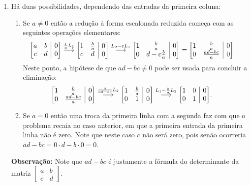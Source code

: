\documentclass[12pt,a4paper]{article}
\makeatletter
\newenvironment{amatrix}[1]{%
  \left[\begin{array}{@{}*{#1}{c}|c@{}}
}{%
  \end{array}\right]
}
\newcommand{\grstep}[2][\relax]{%
   \ensuremath{\mathrel{
       {\mathop{\longrightarrow}\limits^{#2\mathstrut}_{
                                     \begin{subarray}{l} #1 \end{subarray}}}}}}
\makeatother
\begin{document}
\begin{enumerate}
\item Há duas possibilidades, dependendo das entradas da primeira coluna:
\begin{enumerate}
\item Se $a \neq 0$ então a redução à forma escalonada reduzida começa com as seguintes operações elementares:
\begin{align*}
\begin{amatrix}{2}
a & b & 0 \\
c & d & 0
\end{amatrix}
&
\grstep{ \frac{1}{a} L_1 }
\begin{amatrix}{2}
1 & \frac{b}{a} & 0 \\
c & d & 0
\end{amatrix}
\grstep{ L_2 - c L_1 }
\begin{amatrix}{2}
1 & \frac{b}{a} & 0 \\
0 & d-c\frac{b}{a} & 0
\end{amatrix}
=
\begin{amatrix}{2}
1 & \frac{b}{a} & 0 \\
0 & \frac{ad-bc}{a} & 0
\end{amatrix}
\end{align*}
Neste ponto, a hipótese de que $ad-bc \neq 0$ pode ser usada para concluir a eliminação:
\begin{align*}
\begin{amatrix}{2}
1 & \frac{b}{a} & 0 \\
0 & \frac{ad-bc}{a} & 0
\end{amatrix}
&
\grstep{ \frac{a}{ad-bc} L_2 }
\begin{amatrix}{2}
1 & \frac{b}{a} & 0 \\
0 & 1 & 0
\end{amatrix}
\grstep{ L_1 - \frac{b}{a} L_2 }
\begin{amatrix}{2}
1 & 0 & 0 \\
0 & 1 & 0
\end{amatrix}.
\end{align*}
\item Se $a = 0$ então uma troca da primeira linha com a segunda faz com que o problema recaia no caso anterior, em que a primeira entrada da primeira linha não é zero. Note que neste caso $c$ não será zero, pois senão ocorreria $ad-bc = 0 \cdot d-b \cdot 0 = 0$.
\end{enumerate}
\textbf{Observação:} Note que $ad-bc$ é justamente a fórmula do determinante da matriz $\begin{bmatrix}
a & b \\
c & d
\end{bmatrix}$.


\end{enumerate}
\end{document}

